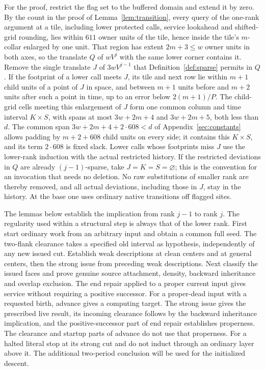 For the proof, restrict the flag set to the buffered domain and extend it by zero. By the count in the proof of Lemma~\ref{lem:transition}, every query of the one-rank argument at a tile, including lower protected calls, service lookahead and shifted-grid rounding, lies within \(611\) owner units of the tile, hence inside the tile's \(m\)-collar enlarged by one unit. That region has extent \(2m+3\le w\) owner units in both axes, so the translate \(Q\) of \(wV^j\) with the same lower corner contains it. Remove the single translate \(J\) of \(3wV^{j-1}\) that Definition~\ref{def:sparse} permits in \(Q\). If the footprint of a lower call meets \(J\), its tile and next row lie within \(m+1\) child units of a point of \(J\) in space, and between \(m+1\) units before and \(m+2\) units after such a point in time, up to an error below \(2(m+1)/P\). The child-grid cells meeting this enlargement of \(J\) form one common column and time interval \(K\times S\), with spans at most \(3w+2m+4\) and \(3w+2m+5\), both less than \(d\). The common span \(3w+2m+4+2\cdot608<d\) of Appendix~\ref{sec:constants} allows padding by \(m+2+608\) child units on every side; it contains this \(K\times S\), and its term \(2\cdot608\) is fixed slack. Lower calls whose footprints miss \(J\) use the lower-rank induction with the actual restricted history. If the restricted deviations in \(Q\) are already \((j-1)\)-sparse, take \(J=K=S=\varnothing\); this is the convention for an invocation that needs no deletion. No raw substitutions of smaller rank are thereby removed, and all actual deviations, including those in \(J\), stay in the history. At the base one uses ordinary native transitions off flagged sites.

The lemmas below establish the implication from rank \(j-1\) to rank \(j\). The regularity used within a structural step is always that of the lower rank. First start ordinary work from an arbitrary input and obtain a common full seed. The two-flank clearance takes a specified old interval as hypothesis, independently of any new issued cut. Establish weak descriptions at clean centers and at general centers, then the strong issue from preceding weak descriptions. Next classify the issued faces and prove genuine source attachment, density, backward inheritance and overlap exclusion. The end repair applied to a proper current input gives service without requiring a positive successor. For a proper-dead input with a requested birth, advance gives a computing target. The strong issue gives the prescribed live result, its incoming clearance follows by the backward inheritance implication, and the positive-successor part of end repair establishes properness. The clearance and startup parts of advance do not use that properness. For a halted literal stop at its strong cut and do not induct through an ordinary layer above it. The additional two-period conclusion will be used for the initialized descent.

